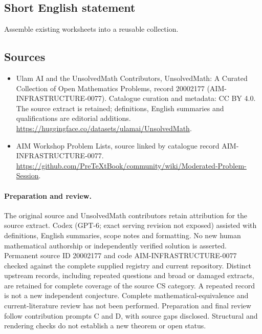 \documentclass[11pt]{article}
\begin{document}
\subsection{Short English statement}
Assemble existing worksheets into a reusable collection.
\subsection{Sources}
\begin{itemize}
\item[\hypertarget{source:20002177:1}{S1}] Ulam AI and the UnsolvedMath Contributors, UnsolvedMath: A Curated Collection of Open Mathematics Problems, record 20002177 (AIM-INFRASTRUCTURE-0077). Catalogue curation and metadata: CC BY 4.0. The source extract is retained; definitions, English summaries and qualifications are editorial additions.
\url{https://huggingface.co/datasets/ulamai/UnsolvedMath}.
\item[\hypertarget{source:20002177:2}{S2}] AIM Workshop Problem Lists, source linked by catalogue record AIM-INFRASTRUCTURE-0077.
\url{https://github.com/PreTeXtBook/community/wiki/Moderated-Problem-Session}.
\end{itemize}
\paragraph{Preparation and review.}
The original source and UnsolvedMath contributors retain attribution for the source extract. Codex (GPT-6; exact serving revision not exposed) assisted with definitions, English summaries, scope notes and formatting. No new human mathematical authorship or independently verified solution is asserted. Permanent source ID 20002177 and code AIM-INFRASTRUCTURE-0077 checked against the complete supplied registry and current repository. Distinct upstream records, including repeated questions and broad or damaged extracts, are retained for complete coverage of the source CS category. A repeated record is not a new independent conjecture. Complete mathematical-equivalence and current-literature review has not been performed. Preparation and final review follow contribution prompts C and D, with source gaps disclosed. Structural and rendering checks do not establish a new theorem or open status.
\label{end:20002177}
\end{document}
